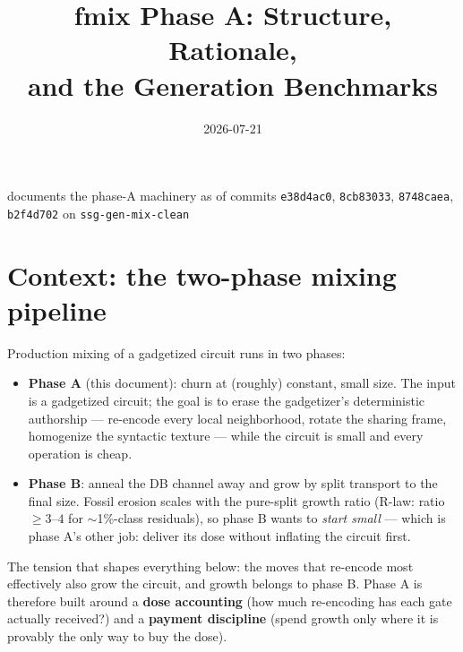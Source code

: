 \documentclass[11pt]{article}
\title{\textbf{fmix Phase A: Structure, Rationale,\\ and the Generation Benchmarks}}
\date{2026-07-21}
\author{}
\newcommand{\code}[1]{\texttt{#1}}
\begin{document}
\maketitle
\vspace{-3em}
\begin{center}\small documents the phase-A machinery as of commits
\code{e38d4ac0}, \code{8cb83033}, \code{8748caea}, \code{b2f4d702}
on \code{ssg-gen-mix-clean}\end{center}

\section{Context: the two-phase mixing pipeline}
Production mixing of a gadgetized circuit runs in two phases:
\begin{itemize}
\item \textbf{Phase A} (this document): churn at (roughly) constant, small
size. The input is a gadgetized circuit; the goal is to erase the
gadgetizer's deterministic authorship --- re-encode every local
neighborhood, rotate the sharing frame, homogenize the syntactic texture ---
while the circuit is small and every operation is cheap.
\item \textbf{Phase B}: anneal the DB channel away and grow by split
transport to the final size. Fossil erosion scales with the pure-split
growth ratio (R-law: ratio $\geq 3$--$4$ for $\sim$1\%-class residuals), so
phase B wants to \emph{start small} --- which is phase A's other job:
deliver its dose without inflating the circuit first.
\end{itemize}
The tension that shapes everything below: the moves that re-encode most
effectively also grow the circuit, and growth belongs to phase B. Phase A is
therefore built around a \textbf{dose accounting} (how much re-encoding has
each gate actually received?) and a \textbf{payment discipline} (spend
growth only where it is provably the only way to buy the dose).
\end{document}
